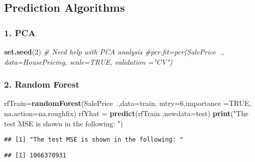 \documentclass[]{article}
\newenvironment{Shaded}{\begin{snugshade}}{\end{snugshade}}
\newcommand{\KeywordTok}[1]{\textcolor[rgb]{0.13,0.29,0.53}{\textbf{{#1}}}}
\newcommand{\DataTypeTok}[1]{\textcolor[rgb]{0.13,0.29,0.53}{{#1}}}
\newcommand{\DecValTok}[1]{\textcolor[rgb]{0.00,0.00,0.81}{{#1}}}
\newcommand{\StringTok}[1]{\textcolor[rgb]{0.31,0.60,0.02}{{#1}}}
\newcommand{\CommentTok}[1]{\textcolor[rgb]{0.56,0.35,0.01}{\textit{{#1}}}}
\newcommand{\OtherTok}[1]{\textcolor[rgb]{0.56,0.35,0.01}{{#1}}}
\newcommand{\NormalTok}[1]{{#1}}
\begin{document}
\subsection{Prediction Algorithms}\label{prediction-algorithms}

\subsubsection{1. PCA}\label{pca}

\begin{Shaded}
\begin{Highlighting}[]
\KeywordTok{set.seed}\NormalTok{(}\DecValTok{2}\NormalTok{)}
\CommentTok{# Need help with PCA analysis}
\CommentTok{#pcr.fit=pcr(SalePrice~., data=HousePricing, scale=TRUE, validation ="CV")}
\end{Highlighting}
\end{Shaded}

\subsubsection{2. Random Forest}\label{random-forest}

\begin{Shaded}
\begin{Highlighting}[]
\NormalTok{rfTrain=}\KeywordTok{randomForest}\NormalTok{(SalePrice~.,}\DataTypeTok{data=}\NormalTok{train, }\DataTypeTok{mtry=}\DecValTok{6}\NormalTok{,}\DataTypeTok{importance =}\OtherTok{TRUE}\NormalTok{, }\DataTypeTok{na.action=}\NormalTok{na.roughfix)}
\NormalTok{rfYhat =}\StringTok{ }\KeywordTok{predict}\NormalTok{(rfTrain ,}\DataTypeTok{newdata=}\NormalTok{test)}
\KeywordTok{print}\NormalTok{(}\StringTok{"The test MSE is shown in the following: "}\NormalTok{)}
\end{Highlighting}
\end{Shaded}

\begin{verbatim}
## [1] "The test MSE is shown in the following: "
\end{verbatim}

\begin{Shaded}
\end{Shaded}

\begin{verbatim}
## [1] 1066370931
\end{verbatim}
\end{document}
